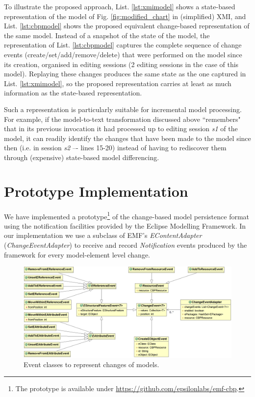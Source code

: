 \documentclass{llncs}
\begin{document}
To illustrate the proposed approach, List. \ref{lst:xmimodel} shows a state-based representation of the model of Fig. \ref{fig:modified_chart} in (simplified) XMI, and List. \ref{lst:cbpmodel} shows the proposed equivalent change-based representation of the same model. Instead of a snapshot of the state of the model, the representation of List. \ref{lst:cbpmodel} captures the complete sequence of change events (create/set/add/remove/delete) that were performed on the model since its creation, organised in editing sessions (2 editing sessions in the case of this model). Replaying these changes produces the same state as the one captured in List. \ref{lst:xmimodel}, so the proposed representation carries at least as much information as the state-based representation.

Such a representation is particularly suitable for incremental model processing. For example, if the model-to-text transformation discussed above ``remembers" that in its previous invocation it had processed up to editing session \emph{s1} of the model, it can readily identify the changes that have been made to the model since then (i.e. in session \emph{s2} –- lines 15-20) instead of having to rediscover them through (expensive) state-based model differencing.

\section{Prototype Implementation}
\label{sec:prototype_implementation}
We have implemented a prototype\footnote{The prototype is available under \url{https://github.com/epsilonlabs/emf-cbp}.} of the change-based model persistence format using the notification facilities provided by the Eclipse Modelling Framework. In our implementation we use a subclass of EMF's \emph{EContentAdapter} (\emph{ChangeEventAdapter}) to receive and record \emph{Notification} events produced by the framework for every model-element level change.

\begin{figure}[th]
\centering
\includegraphics[scale=0.32]{events}
\caption{Event classes to represent changes of models.}
\label{fig:events}
\end{figure}
\end{document}
